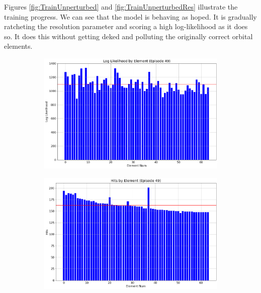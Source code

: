 Figures \ref{fig:TrainUnperturbed} and \ref{fig:TrainUnperturbedRes} illustrate the training progress.
We can see that the model is behaving as hoped.
It is gradually ratcheting the resolution parameter and scoring a high log-likelihood as it does so.
It does this without getting deked and polluting the originally correct orbital elements.
\newcommand{\subfigwidth}{0.5}
\begin{figure}[h]
\begin{subfigure}[t]{\subfigwidth\textwidth}
\centering
\includegraphics[width=\linewidth]{../figs/search_known/unperturbed/log_like.png}
\end{subfigure}
\hfill
\begin{subfigure}[t]{\subfigwidth\textwidth}
\centering
\includegraphics[width=\linewidth]{../figs/search_known/unperturbed/hits.png}
\end{subfigure}
\medskip
\begin{subfigure}[t]{\subfigwidth\textwidth}

\end{subfigure}
\end{figure}
